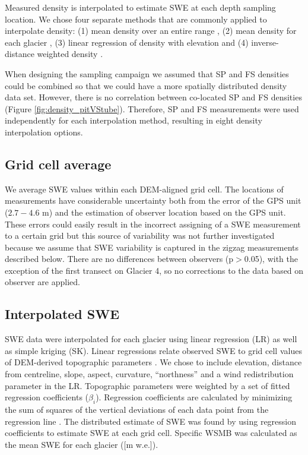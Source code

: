 \documentclass[twocolumn,letterpaper]{igs}
\begin{document}
Measured density is interpolated to estimate SWE at each depth sampling location. We chose four separate methods that are commonly applied to interpolate density: (1) mean density over an entire range \citep[e.g.][]{Cullen2017}, (2) mean density for each glacier \citep[e.g.][]{Elder1991, McGrath2015}, (3) linear regression of density with elevation \citep[e.g.][]{Elder1998, Molotch2005} and (4) inverse-distance weighted density \citep[e.g.][]{Molotch2005}. 

When designing the sampling campaign we assumed that SP and FS densities could be combined so that we could have a more spatially distributed density data set. However, there is no correlation between co-located SP and FS densities (Figure \ref{fig:density_pitVStube}). Therefore, SP and FS measurements were used independently for each interpolation method, resulting in eight density interpolation options. 

\subsection{Grid cell average}

We average SWE values within each DEM-aligned grid cell. The locations of measurements have considerable uncertainty both from the error of the GPS unit ($2.7 - 4.6$ m) and the estimation of observer location based on the GPS unit. These errors could easily result in the incorrect assigning of a SWE measurement to a certain grid but this source of variability was not further investigated because we assume that SWE variability is captured in the zigzag measurements described below. There are no differences between observers (p$>$0.05), with the exception of the first transect on Glacier 4, so no corrections to the data based on observer are applied.

\subsection{Interpolated SWE}

SWE data were interpolated for each glacier using linear regression (LR) as well as simple kriging (SK). Linear regressions relate observed SWE to grid cell values of DEM-derived topographic parameters \citep{Davis1986}. We chose to include elevation, distance from centreline, slope, aspect, curvature, ``northness'' and a wind redistribution parameter in the LR. Topographic parameters were weighted by a set of fitted regression coefficients ($\beta_i$). Regression coefficients are calculated by minimizing the sum of squares of the vertical deviations of each data point from the regression line \citep{Davis1986}. The distributed estimate of SWE was found by using regression coefficients to estimate SWE at each grid cell. Specific WSMB was calculated as the mean SWE for each glacier ([m w.e.]). 
\end{document}
